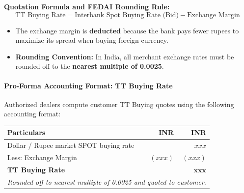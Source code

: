 \noindent\textbf{Quotation Formula and FEDAI Rounding Rule:}
\begin{equation}
    \text{TT Buying Rate} = \text{Interbank Spot Buying Rate (Bid)} - \text{Exchange Margin}
\end{equation}
\begin{itemize}[leftmargin=*, noitemsep]
    \item The exchange margin is \textbf{deducted} because the bank pays fewer rupees to maximize its spread when buying foreign currency.
    \item \textbf{Rounding Convention:} In India, all merchant exchange rates must be rounded off to the \textbf{nearest multiple of 0.0025}.
\end{itemize}

\paragraph{Pro-Forma Accounting Format: TT Buying Rate}
Authorized dealers compute customer TT Buying quotes using the following accounting format:

\begin{center}
\small
\begin{tabularx}{0.88\linewidth}{Xrr}
\toprule
\textbf{Particulars} & \textbf{INR} & \textbf{INR} \\
\midrule
Dollar / Rupee market SPOT buying rate & & $xxx$ \\
Less: Exchange Margin & $(xxx)$ & $(xxx)$ \\
\midrule
\textbf{TT Buying Rate} & & $\mathbf{xxx}$ \\
\bottomrule
\multicolumn{3}{l}{\footnotesize\textit{Rounded off to nearest multiple of 0.0025 and quoted to customer.}}
\end{tabularx}
\end{center}

